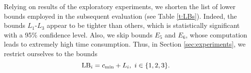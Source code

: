 \begin{table}[h!]

\centering
	\scriptsize
    \caption{Lower bounds: (a) bound names; (b) for each bound we present 95\%-confidence interval for its averaged ratio to  $L_3$}\label{t:LBs}
   \quad
\end{table}

Relying on results of the exploratory experiments, we shorten the list of lower bounds employed in the subsequent evaluation 
(see Table \ref{t:LBs}). Indeed, the bounds  $L_1$-$L_3$ appear to be tighter than others, which is statistically significant with a 95\% confidence level. Also, we skip bounds $E_5$ and $E_6$, whose computation leads to extremely high time consumption. Thus, in Section \ref{sec:experiments}, we restrict ourselves to the bounds 
\[
	\mathrm{LB}_i = c_{\min} + L_i,\ i\in\{1,2,3\}.
\]    

